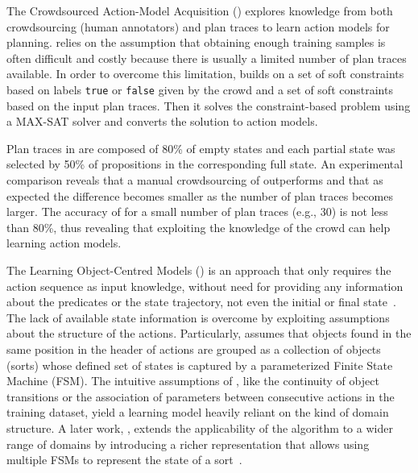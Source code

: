 The Crowdsourced Action-Model Acquisition (\textbf{\CAMA}) \cite{Zhuo15} explores knowledge from both crowdsourcing (human annotators) and plan traces to learn action models for planning. \CAMA relies on the assumption that obtaining enough training samples is often difficult and costly because there is usually a limited number of plan traces available. In order to overcome this limitation, \CAMA builds on a set of soft constraints based on labels \texttt{true} or \texttt{false} given by the crowd and a set of soft constraints based on the input plan traces. Then it solves the constraint-based problem using a MAX-SAT solver and converts the solution to action models.

Plan traces in \CAMA are composed of 80\% of empty states and each partial state was selected by 50\% of propositions in the corresponding full state. An experimental comparison reveals that a manual crowdsourcing of \CAMA outperforms \ARMS and that as expected the difference becomes smaller as the number of plan traces becomes larger. The accuracy of \CAMA for a small number of plan traces (e.g., 30) is not less than 80\%, thus revealing that exploiting the knowledge of the crowd can help learning action models.



The Learning Object-Centred Models (\textbf{\LOCM}) is an approach that only requires the \FO action sequence as input knowledge, without need for providing any information about the predicates or the state trajectory, not even the initial or final state~\cite{CresswellMW09,cresswell2013acquiring}. The lack of available state information is overcome by exploiting assumptions about the structure of the actions. Particularly, \LOCM assumes that objects found in the same position in the header of actions are grouped as a collection of objects (sorts) whose defined set of states is captured by a parameterized Finite State Machine (FSM). The intuitive assumptions of \LOCM, like the continuity of object transitions or the association of parameters between consecutive actions in the training dataset, yield a learning model heavily reliant on the kind of domain structure. A later work, \textbf{\LOCMtwo}, extends the applicability of the \LOCM algorithm to a wider range of domains by introducing a richer representation that allows using multiple FSMs to represent the state of a sort~\cite{cresswell2011generalised}.

